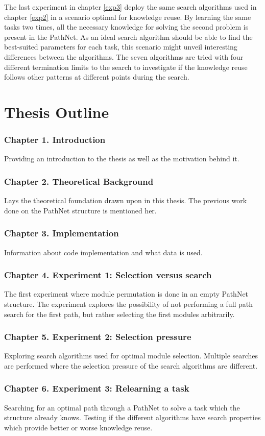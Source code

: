 The last experiment in chapter \ref{exp3} deploy the same search algorithms used in chapter \ref{exp2} in a scenario optimal for knowledge reuse. By learning the same tasks two times, all the necessary knowledge for solving the second problem is present in the PathNet. As an ideal search algorithm should be able to find the best-suited parameters for each task, this scenario might unveil interesting differences between the algorithms. The seven algorithms are tried with four different termination limits to the search to investigate if the knowledge reuse follows other patterns at different points during the search. 


\section{Thesis Outline}
\subsubsection{Chapter 1. Introduction}
Providing an introduction to the thesis as well as the motivation behind it.
\subsubsection{Chapter 2. Theoretical Background}
Lays the theoretical foundation drawn upon in this thesis. The previous work done on the PathNet structure is mentioned her.
\subsubsection{Chapter 3. Implementation}
Information about code implementation and what data is used.
\subsubsection{Chapter 4. Experiment 1: Selection versus search}
The first experiment where module permutation is done in an empty PathNet structure. The experiment explores the possibility of not performing a full path search for the first path, but rather selecting the first modules arbitrarily.
\subsubsection{Chapter 5. Experiment 2: Selection pressure}
Exploring search algorithms used for optimal module selection. Multiple searches are performed where the selection pressure of the search algorithms are different. 
\subsubsection{Chapter 6. Experiment 3: Relearning a task}
Searching for an optimal path through a PathNet to solve a task which the structure already knows. Testing if the different algorithms have search properties which provide better or worse knowledge reuse.
